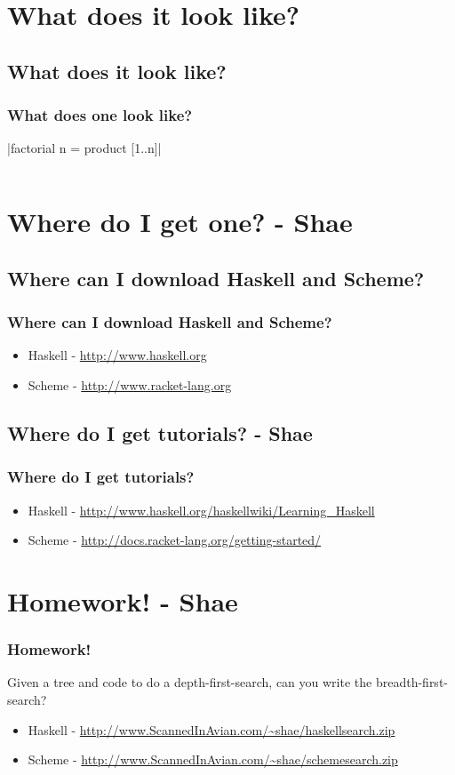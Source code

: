 \documentclass[xcolor=pdftex,dvipsnames,table]{beamer}
\begin{document}
\section{What does it look like?}
\subsection{What does it look like?}
\begin{frame}
  \frametitle{What does one look like?}
  |factorial n = product [1..n]|
  \inputminted{scheme}{fac.scm}
\end{frame}

\section{Where do I get one? - Shae}
\subsection{Where can I download Haskell and Scheme?}
\begin{frame}
  \frametitle{Where can I download Haskell and Scheme?}
  \begin{itemize}
  \item Haskell - \url{http://www.haskell.org}
  \item Scheme - \url{http://www.racket-lang.org}
  \end{itemize}
\end{frame}

\subsection{Where do I get tutorials? - Shae}
\begin{frame}
  \frametitle{Where do I get tutorials?}
  \begin{itemize}
  \item Haskell - \url{http://www.haskell.org/haskellwiki/Learning_Haskell}
  \item Scheme - \url{http://docs.racket-lang.org/getting-started/}
  \end{itemize}
\end{frame}

\section{Homework! - Shae}
\begin{frame}
  \frametitle{Homework!}
  Given a tree and code to do a depth-first-search, can you write the breadth-first-search?
  \begin{itemize}
  \item Haskell - \url{http://www.ScannedInAvian.com/~shae/haskellsearch.zip}
  \item Scheme - \url{http://www.ScannedInAvian.com/~shae/schemesearch.zip}
  \end{itemize}
\end{frame}
\end{document}

